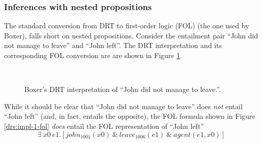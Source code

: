 \subsubsection*{Inferences with nested propositions}

The standard conversion from DRT to first-order logic (FOL) (the one used by
Boxer), falls short on nested propositions.  Consider the entailment pair ``John
did not manage to leave'' and ``John left''.  The DRT interpretation and its
corresponding FOL conversion are are shown in Figure \ref{drs:impl-1}.

\begin{figure}
  \centering
  ~~~~~~~~~
  \caption{Boxer's DRT interpretation of ``John did not manage to leave.''.}
  \label{drs:impl-1}
\end{figure}

While it should be clear that ``John did not manage to leave'' does {\it not}
entail ``John left'' (and, in fact, entails the opposite), the FOL formula shown
in Figure \ref{drs:impl-1-fol} {\it does} entail the FOL representation of
``John left'' \[ \exists~ x0~e1.[john_{1001}(x0) ~\&~ leave_{1006}(e1) ~\&~
agent(e1, x0)] \]  

